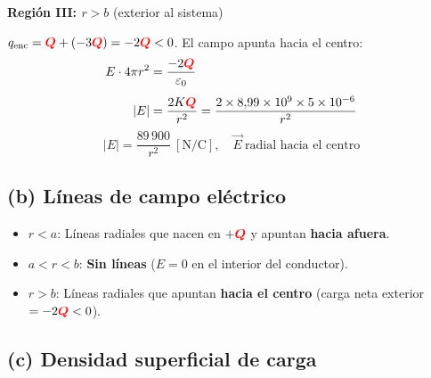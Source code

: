 \documentclass[12pt,letterpaper]{article}
\newcommand{\Qr}{{\color{red}\bm{Q}}}
\begin{document}
\bigskip

\noindent
\begin{minipage}[c]{0.30\textwidth}
\centering
{}
\end{minipage}%
\hfill
\begin{minipage}[c]{0.67\textwidth}
\textbf{Regi\'on III: $r > b$} (exterior al sistema)

$q_\text{enc} = \Qr + (-3\Qr) = -2\Qr < 0$. El campo apunta hacia el centro:
\begin{align*}
    E \cdot 4\pi r^2 &= \frac{-2\Qr}{\varepsilon_0} \\[4pt]
    |E| &= \frac{2K\Qr}{r^2} = \frac{2 \times 8{,}99\times10^9 \times 5\times10^{-6}}{r^2}
\end{align*}
\[
    \boxed{|E| = \frac{89\,900}{r^2}\ [\text{N/C}],\quad \vec{E}\ \text{radial hacia el centro}}
\]
\end{minipage}

\subsection*{(b) L\'ineas de campo el\'ectrico}

\begin{itemize}
    \item $r < a$: L\'ineas radiales que nacen en $+\Qr$ y apuntan \textbf{hacia afuera}.
    \item $a < r < b$: \textbf{Sin l\'ineas} ($E = 0$ en el interior del conductor).
    \item $r > b$: L\'ineas radiales que apuntan \textbf{hacia el centro} (carga neta exterior $= -2\Qr < 0$).
\end{itemize}

\subsection*{(c) Densidad superficial de carga}
\end{document}
